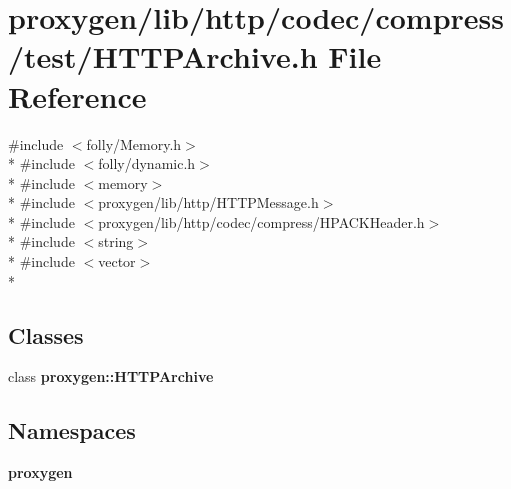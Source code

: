 \section{proxygen/lib/http/codec/compress/test/\+H\+T\+T\+P\+Archive.h File Reference}
\label{HTTPArchive_8h}
{\ttfamily \#include $<$folly/\+Memory.\+h$>$}\\*
{\ttfamily \#include $<$folly/dynamic.\+h$>$}\\*
{\ttfamily \#include $<$memory$>$}\\*
{\ttfamily \#include $<$proxygen/lib/http/\+H\+T\+T\+P\+Message.\+h$>$}\\*
{\ttfamily \#include $<$proxygen/lib/http/codec/compress/\+H\+P\+A\+C\+K\+Header.\+h$>$}\\*
{\ttfamily \#include $<$string$>$}\\*
{\ttfamily \#include $<$vector$>$}\\*
\subsection*{Classes}
\begin{DoxyCompactItemize}
\item 
class {\bf proxygen\+::\+H\+T\+T\+P\+Archive}
\end{DoxyCompactItemize}
\subsection*{Namespaces}
\begin{DoxyCompactItemize}
\item 
 {\bf proxygen}
\end{DoxyCompactItemize}
